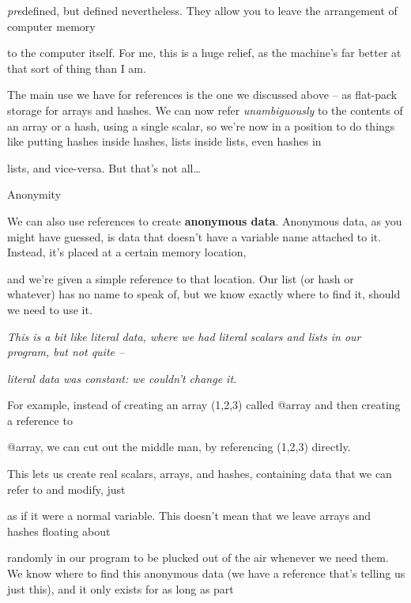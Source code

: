 \documentclass[a4paper,11pt]{book}
\begin{document}
\noindent \textit{pre}defined,  but defined nevertheless.  They  allow  you  to  leave  the arrangement  of  computer  memory

\noindent to  the  computer  itself. For me,  this  is  a  huge  relief,  as the  machine's  far better  at  that sort  of  thing than I am.

\noindent 

\noindent The main use we have for references is the one we discussed above -- as flat-pack storage for arrays and hashes. We can now refer \textit{unambiguously }to the contents of an array or a hash, using a single scalar, so we're now in a position to do things like putting hashes inside hashes, lists inside lists, even hashes in

\noindent lists, and vice-versa. But that's not all\dots 

\noindent 

\noindent Anonymity

\noindent 

\noindent We can also use references to create \textbf{anonymous data}. Anonymous data, as you might have guessed, is data that doesn't have a variable name attached to it. Instead, it's placed at a certain memory location,

\noindent and we're given a simple reference to that location. Our list (or hash or whatever) has no name to speak of, but we know exactly where to find it, should we need to use it.

\noindent 

\noindent \textit{This is a bit like literal data, where we had literal scalars and lists in our program, but not quite --}

\noindent \textit{literal data was constant: we couldn't change it.}

\noindent 

\noindent 

\noindent For example, instead of creating an array (1,2,3) called @array and then creating a reference to

\noindent @array, we can cut out the middle man, by referencing (1,2,3) directly.

\noindent 

\noindent This lets us create real scalars, arrays, and hashes, containing data that we can refer to and modify, just

\noindent as if it were a normal variable. This doesn't mean that we leave arrays and hashes floating about

\noindent randomly in our program to be plucked out of the air whenever we need them. We know where to find this anonymous data (we have a reference that's telling us just this), and it only exists for as long as part
\end{document}
